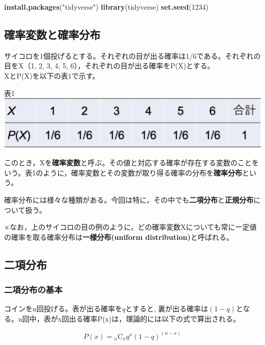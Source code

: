 \documentclass[]{article}
\newenvironment{Shaded}{\begin{snugshade}}{\end{snugshade}}
\newcommand{\KeywordTok}[1]{\textcolor[rgb]{0.13,0.29,0.53}{\textbf{#1}}}
\newcommand{\DecValTok}[1]{\textcolor[rgb]{0.00,0.00,0.81}{#1}}
\newcommand{\StringTok}[1]{\textcolor[rgb]{0.31,0.60,0.02}{#1}}
\newcommand{\NormalTok}[1]{#1}
\begin{document}
\begin{Shaded}
\begin{Highlighting}[]
\KeywordTok{install.packages}\NormalTok{(}\StringTok{"tidyverse"}\NormalTok{)}
\KeywordTok{library}\NormalTok{(tidyverse)}
\KeywordTok{set.seed}\NormalTok{(}\DecValTok{1234}\NormalTok{)}
\end{Highlighting}
\end{Shaded}

\subsection{確率変数と確率分布}

サイコロを1個投げるとする。それぞれの目が出る確率は1/6である。それぞれの目をX（1,
2, 3, 4, 5, 6），それぞれの目が出る確率をP(X)とする。\\
XとP(X)を以下の表1で示す。

表1\\
\includegraphics{04_table01.png}

このとき，Xを\textbf{確率変数}と呼ぶ。その値と対応する確率が存在する変数のことをいう。表1のように，確率変数とその変数が取り得る確率の分布を\textbf{確率分布}という。

確率分布には様々な種類がある。今回は特に，その中でも\textbf{二項分布}と\textbf{正規分布}について扱う。

※なお，上のサイコロの目の例のように，どの確率変数Xについても常に一定値の確率を取る確率分布は\textbf{一様分布(uniform
distribution)}と呼ばれる。

\subsection{二項分布}

\subsubsection{二項分布の基本}

コインをn回投げる。表が出る確率を\(q\)とすると,
裏が出る確率は\((1-q)\)となる。n回中，表がx回出る確率P(x)は，理論的には以下の式で算出される。

\[
P(x) = {}_n\mathrm{C}_xq^{x}(1-q)^{(n-x)}
\]
\end{document}
